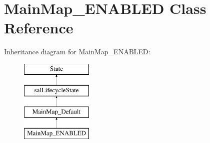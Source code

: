 \hypertarget{class_main_map___e_n_a_b_l_e_d}{\section{Main\-Map\-\_\-\-E\-N\-A\-B\-L\-E\-D Class Reference}
\label{class_main_map___e_n_a_b_l_e_d}
}
Inheritance diagram for Main\-Map\-\_\-\-E\-N\-A\-B\-L\-E\-D\-:\begin{figure}[H]
\begin{center}
\leavevmode
\includegraphics[height=4.000000cm]{class_main_map___e_n_a_b_l_e_d}
\end{center}
\end{figure}
